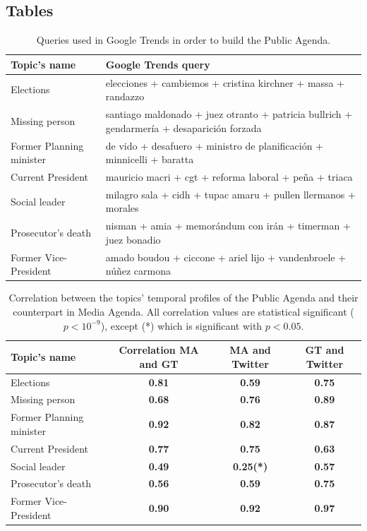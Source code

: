 \documentclass{bmcart}
\begin{document}
\begin{backmatter}
\section*{Tables}

\begin{table}[h!]
\caption{Queries used in Google Trends in order to build the Public Agenda.}
\begin{tabular}{l|p{7.5cm}}
Topic's name & Google Trends query \\ \hline
Elections & elecciones + cambiemos + cristina kirchner + massa + randazzo \\
Missing person & santiago maldonado + juez otranto + patricia bullrich + gendarmería + desaparici\'on forzada \\
Former Planning minister & de vido + desafuero + ministro de planificaci\'on + minnicelli + baratta \\
Current President & mauricio macri + cgt + reforma laboral + peña + triaca \\
Social leader & milagro sala + cidh + tupac amaru + pullen llermanos + morales \\
Prosecutor's death & nisman + amia + memor\'andum con ir\'an + timerman + juez bonadio \\
Former Vice-President & amado boudou + ciccone + ariel lijo + vandenbroele + núñez carmona \\
\end{tabular}
\label{table:gt_queries}
\end{table}

\begin{table}[h!]
\caption{Correlation between the topics' temporal profiles of the Public Agenda and their counterpart in Media Agenda.
All correlation values are statistical significant ($p < 10^{-9}$), except (*) which is significant with $p < 0.05$.}
\begin{tabular}{lccc}
Topic's name & Correlation MA and GT & MA and Twitter & GT and Twitter \\ \hline
Elections & \textbf{0.81} & \textbf{0.59} & \textbf{0.75} \\
Missing person & \textbf{0.68} & \textbf{0.76} & \textbf{0.89} \\
Former Planning minister & \textbf{0.92} & \textbf{0.82} & \textbf{0.87} \\
Current President & \textbf{0.77} & \textbf{0.75} & \textbf{0.63} \\
Social leader & \textbf{0.49} & \textbf{0.25(*)} & \textbf{0.57} \\
Prosecutor's death & \textbf{0.56} & \textbf{0.59} & \textbf{0.75} \\
Former Vice-President & \textbf{0.90} & \textbf{0.92} & \textbf{0.97}\\
\end{tabular}
\label{table:gt_all_correlation}
\end{table}


\end{backmatter}
\end{document}
